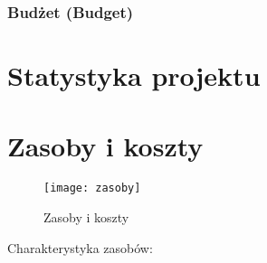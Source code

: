 \subsection{Budżet (Budget)}


\chapter{Statystyka projektu}
\chapter{Zasoby i koszty}
\begin{figure}[H]
\centering
  \texttt{[image: zasoby]}
  \caption{Zasoby i koszty}
  \label{zasoby}
\end{figure}

Charakterystyka zasobów:

